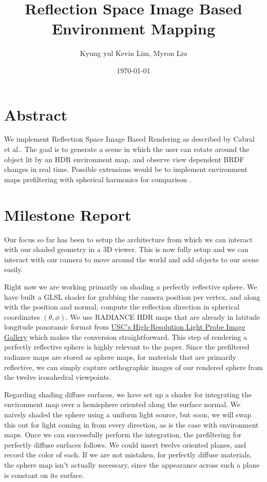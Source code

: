 \documentclass[12pt]{article}
\begin{document}
\title{Reflection Space Image Based Environment Mapping}
\author{Kyung yul Kevin Lim, Myron Liu}
\date{\today}
\maketitle

\section{Abstract}
We implement Reflection Space Image Based Rendering as described by Cabral et al.\cite{cabral1999reflection}. The goal is to generate a scene in which the user can rotate around the object lit by an HDR environment map, and observe view dependent BRDF changes in real time. Possible extensions would be to implement environment maps prefiltering with spherical harmonics for comparison \cite{ramamoorthi2001efficient}.


\section{Milestone Report}

Our focus so far has been to setup the architecture from which we can interact with our shaded geometry in a 3D viewer. This is now fully setup and we can interact with our camera to move around the world and add objects to our scene easily.

Right now we are working primarily on shading a perfectly reflective sphere. We have built a GLSL shader for grabbing the camera position per vertex, and along with the position and normal, compute the reflection direction in spherical coordinates $(\theta,\phi)$. We use RADIANCE HDR maps that are already in latitude longitude panoramic format from \href{http://gl.ict.usc.edu/Data/HighResProbes/}{USC's High-Resolution Light Probe Image Gallery} which makes the conversion straightforward. This step of rendering a perfectly reflective sphere is highly relevant to the paper. Since the prefiltered radiance maps are stored as sphere maps, for materials that are primarily reflective, we can simply capture orthographic images of our rendered sphere from the twelve icosahedral viewpoints.

Regarding shading diffuse surfaces, we have set up a shader for integrating the environment map over a hemisphere oriented along the surface normal. We naively shaded the sphere using a uniform light source, but soon, we will swap this out for light coming in from every direction, as is the case with environment maps. Once we can successfully perform the integration, the prefiltering for perfectly diffuse surfaces follows. We could insert twelve oriented planes, and record the color of each. If we are not mistaken, for perfectly diffuse materials, the sphere map isn't actually necessary, since the appearance across such a plane is constant on its surface.
\end{document}
